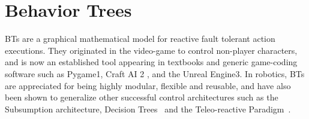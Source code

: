 \section{Behavior Trees}
\label{sec:trees}


BTs are a graphical mathematical model for reactive fault tolerant action executions. They originated in the video-game to control non-player characters, and is now an established tool appearing in textbooks \cite{millington2009artificial,rabin2014gameAiPro} and generic game-coding software such as Pygame1, Craft AI 2 , and the Unreal Engine3. In robotics, BTs are appreciated for being highly modular, flexible and reusable, and have also been shown to generalize other successful control architectures such as the Subsumption architecture, Decision Trees~\cite{colledachise17tro} and the Teleo-reactive Paradigm~\cite{Colledanchise16iros}.
% 
%
%
